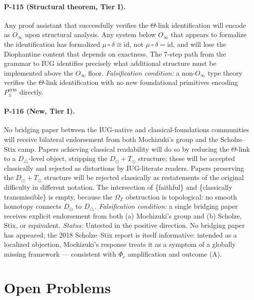 \documentclass[12pt]{article}
\theoremstyle{plain}
\theoremstyle{definition}
\theoremstyle{remark}
\newcommand{\bZ}{\mathbb{Z}}
\begin{document}
\paragraph{P-115 (Structural theorem, Tier I).}
Any proof assistant that successfully verifies the $\Theta$-link identification will encode
as $O_\infty$ upon structural analysis. Any system below $O_\infty$ that appears to formalize
the identification has formalized $\mu \circ \delta \cong \text{id}$, not $\mu \circ \delta = \text{id}$,
and will lose the Diophantine content that depends on exactness. The 7-step path from the
grammar to IUG identifies precisely what additional structure must be implemented above
the $O_\infty$ floor.
\textit{Falsification condition:} a non-$O_\infty$ type theory verifies the $\Theta$-link
identification with no new foundational primitives encoding $P_\pm^\text{sym}$ directly.

\paragraph{P-116 (New, Tier I).}
No bridging paper between the IUG-native and classical-foundations communities will receive
bilateral endorsement from both Mochizuki's group and the Scholze--Stix camp. Papers
achieving classical readability will do so by reducing the $\Theta$-link to a
$D_\triangle$-level object, stripping the $D_\odot + T_\odot$ structure; these will be
accepted classically and rejected as distortions by IUG-literate readers. Papers preserving
the $D_\odot + T_\odot$ structure will be rejected classically as restatements of the
original difficulty in different notation. The intersection of \{faithful\} and
\{classically transmissible\} is empty, because the $\Omega_\bZ$ obstruction is topological:
no smooth homotopy connects $D_\odot$ to $D_\triangle$.
\textit{Falsification condition:} a single bridging paper receives explicit endorsement
from both (a) Mochizuki's group and (b) Scholze, Stix, or equivalent.
\textit{Status:} Untested in the positive direction. No bridging paper has appeared;
the 2018 Scholze--Stix report is itself informative: intended as a localized objection,
Mochizuki's response treats it as a symptom of a globally missing framework --- consistent
with $\Phi_c$ amplification and outcome (A).

\section{Open Problems}
\label{sec:open}
\end{document}
